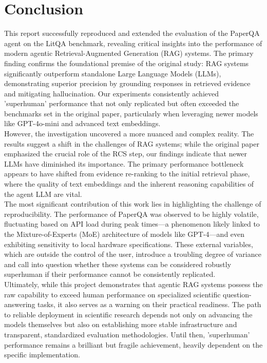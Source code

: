 \section{Conclusion}
\label{sec:conclusion}
This report successfully reproduced and extended the evaluation of the PaperQA agent on the LitQA benchmark, revealing critical insights into the performance of modern agentic Retrieval-Augmented Generation (RAG) systems. The primary finding confirms the foundational premise of the original study: RAG systems significantly outperform standalone Large Language Models (LLMs), demonstrating superior precision by grounding responses in retrieved evidence and mitigating hallucination. Our experiments consistently achieved 'superhuman' performance that not only replicated but often exceeded the benchmarks set in the original paper, particularly when leveraging newer models like GPT-4o-mini and advanced text embeddings. \\

However, the investigation uncovered a more nuanced and complex reality. The results suggest a shift in the challenges of RAG systems; while the original paper emphasized the crucial role of the RCS step, our findings indicate that newer LLMs have diminished its importance. The primary performance bottleneck appears to have shifted from evidence re-ranking to the initial retrieval phase, where the quality of text embeddings and the inherent reasoning capabilities of the agent LLM are vital. \\

The most significant contribution of this work lies in highlighting the challenge of reproducibility. The performance of PaperQA was observed to be highly volatile, fluctuating based on API load during peak times—a phenomenon likely linked to the Mixture-of-Experts (MoE) architecture of models like GPT-4—and even exhibiting sensitivity to local hardware specifications. These external variables, which are outside the control of the user, introduce a troubling degree of variance and call into question whether these systems can be considered robustly superhuman if their performance cannot be consistently replicated.\\

Ultimately, while this project demonstrates that agentic RAG systems possess the raw capability to exceed human performance on specialized scientific question-answering tasks, it also serves as a warning on their practical readiness. The path to reliable deployment in scientific research depends not only on advancing the models themselves but also on establishing more stable infrastructure and transparent, standardized evaluation methodologies. Until then, 'superhuman' performance remains a brilliant but fragile achievement, heavily dependent on the specific implementation.\\

